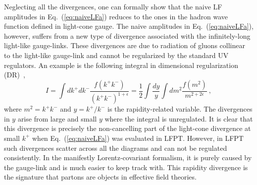\documentclass[twocolumn,superscriptaddress,longbibliography,10pt]{revtex4-1}
\begin{document}
Neglecting all the divergences, one can formally show that the naive LF amplitudes in Eq.~(\ref{eq:naiveLFa}) reduces to the ones in the hadron wave function defined in light-cone gauge. The naive amplitudes in Eq.~(\ref{eq:naiveLFa}), however, suffers from a new type of divergence associated with the infinitely-long light-like gauge-links. These divergences are due to radiation of gluons collinear to the light-like gauge-link and cannot be regularized by the standard UV regulators. An example is
the following integral in dimensional regularization (DR)~\cite{Ebert:2019okf},
\begin{equation}
     I = \int dk^+dk^- \frac{f(k^+k^-)}{(k^+k^-)^{1+\epsilon}} = \frac{1}{2}
     \int \frac{dy}{y} \int dm^2 \frac{f(m^2)}{m^{2+2\epsilon}}\ ,
\end{equation}
where $m^2=k^+k^-$ and $y = k^+/k^-$ is the rapidity-related variable. The divergences
in $y$ arise from large and small $y$ where the integral is unregulated.  It is clear that this divergence is precisely the non-cancelling part of the
light-cone divergence at small $k^+$ when Eq.~(\ref{eq:naiveLFa}) was evaluated in LFPT. However, in LFPT such divergences scatter across all the diagrams and can not be regulated consistently. In the manifestly Lorentz-covariant formalism, it is purely caused by the gauge-link and is much easier to keep track with.
This rapidity divergence is the signature that partons are objects in effective field theories.
\end{document}
